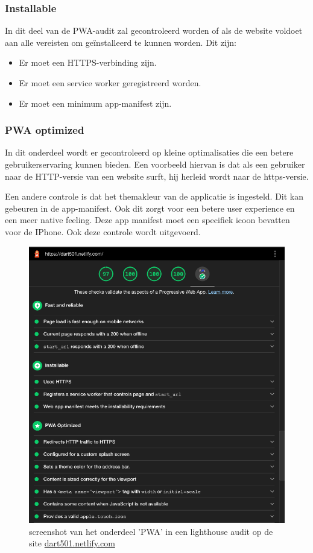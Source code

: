 	
	\subsubsection{Installable}
	
		In dit deel van de PWA-audit zal gecontroleerd worden of als de website voldoet aan alle vereisten om geïnstalleerd te kunnen worden. Dit zijn:
		\begin{itemize}
			\item	Er moet een HTTPS-verbinding zijn.
			\item	Er moet een service worker geregistreerd worden.
			\item	Er moet een minimum app-manifest zijn.
		\end{itemize}
	
		\autocite{web.dev2020a}
		
	
	\subsubsection{PWA optimized}
	
		In dit onderdeel wordt er gecontroleerd op kleine optimalisaties die een betere gebruikerservaring kunnen bieden. 
		Een voorbeeld hiervan is dat als een gebruiker naar de HTTP-versie van een website surft, hij herleid wordt naar de https-versie.
		
		Een andere controle is dat het themakleur van de applicatie is ingesteld. Dit kan gebeuren in de app-manifest. Ook dit zorgt voor een betere user experience en een meer native feeling. Deze app manifest moet een specifiek icoon bevatten voor de IPhone. Ook deze controle wordt uitgevoerd.
		
		
		\begin{figure}[H]
			\centering
			\includegraphics{./img/lighthouse.png}
			\caption{screenshot van het onderdeel 'PWA' in een lighthouse audit op de site \href{ https://dart501.netlify.com}{dart501.netlify.com} }
		\end{figure}
		

